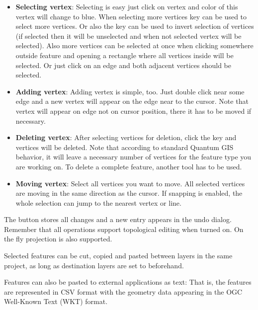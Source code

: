 \begin{itemize}[label=--]
\item \textbf{Selecting vertex}: Selecting is easy just click on vertex and
color of this vertex will change to blue. When selecting more vertices
 key can be used to select more vertices. Or also the
 key can be used to invert selection of vertices (if selected then
it will be unselected and when not selected vertex will be selected). Also more
vertices can be selected at once when clicking somewhere outside feature and opening a rectangle where all vertices inside will be selected. Or just click on an edge and
both adjacent vertices should be selected.
\item \textbf{Adding vertex}: Adding vertex is simple, too. Just double click near
some edge and a new vertex will appear on the edge near to the cursor. Note that
vertex will appear on edge not on cursor position, there it has to be moved if
necessary.
\item \textbf{Deleting vertex}: After selecting vertices for deletion, click the
 key and vertices will be deleted. Note that according to
standard Quantum GIS behavior, it will leave a necessary number of vertices for
the feature type you are working on. To delete a complete feature, another tool
has to be used.
\item \textbf{Moving vertex}: Select all vertices you want to move. All selected
vertices are moving in the same direction as the cursor. If snapping is enabled,
the whole selection can jump to the nearest vertex or line.
\end{itemize}

The  button stores all changes and a new entry appears in the undo
dialog. Remember that all operations support topological editing when turned on. On
the fly projection is also supported.


Selected features can be cut, copied and pasted between layers in the
same \qg project, as long as destination layers are set to
 beforehand.

Features can also be pasted to external applications as text:  That is,
the features are represented in CSV format with the geometry data appearing
in the OGC Well-Known Text (WKT) format.


